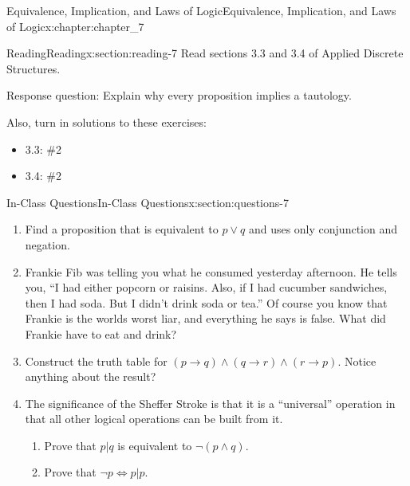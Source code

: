 \documentclass[oneside,10pt,]{book}
\numberwithin{equation}{section}
\begin{document}
\begin{chapterptx}{Equivalence, Implication, and Laws of Logic}{}{Equivalence, Implication, and Laws of Logic}{}{}{x:chapter:chapter_7}
%
%
%
%
%
\typeout{************************************************}
\typeout{************************************************}
%
\begin{sectionptx}{Reading}{}{Reading}{}{}{x:section:reading-7}
Read sections 3.3 and 3.4 of Applied Discrete Structures.%
\par
Response question: Explain why every proposition implies a tautology.%
\par
Also, turn in solutions to these exercises:%
\begin{itemize}[label=\textbullet]
\item{}3.3: \#2%
\item{}3.4: \#2%
\end{itemize}
%
\end{sectionptx}
%
%
\typeout{************************************************}
\typeout{************************************************}
%
\begin{sectionptx}{In-Class Questions}{}{In-Class Questions}{}{}{x:section:questions-7}
%
\begin{enumerate}[label=\arabic*.]
\item{}Find a proposition that is equivalent to \(p \lor  q\) and uses only conjunction and negation.%
\item{}Frankie Fib was telling you what he consumed yesterday afternoon. He tells you, ``I had either popcorn or raisins. Also, if I had cucumber sandwiches, then I had soda. But I didn't drink soda or tea.'' Of course you know that Frankie is the worlds worst liar, and everything he says is false. What did Frankie have to eat and drink?%
\item{}Construct the truth table for \((p \rightarrow q) \land (q \rightarrow r) \land (r \rightarrow p)\).   Notice anything about the result?%
\item{}The significance of the Sheffer Stroke is that it is a ``universal'' operation in that all other logical operations can be built from it.%
\begin{enumerate}[label=(\alph*)]
\item{}Prove that \(p | q\) is equivalent to \(\neg (p \land  q)\).%
\item{}Prove that \(\neg p \Leftrightarrow  p | p\).%

\end{enumerate}
\end{enumerate}
\end{sectionptx}
\end{chapterptx}
\end{document}
